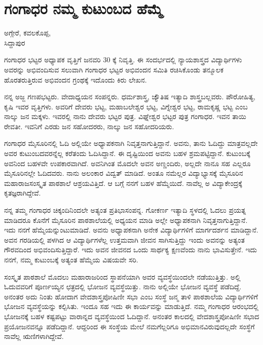 {\fontsize{14}{16}\selectfont
\chapter{ಗಂಗಾಧರ ನಮ್ಮ ಕುಟುಂಬದ ಹೆಮ್ಮೆ}

\begin{center}
\smallskip

ಅಗ್ಗೇರೆ, ಕವಲಕೊಪ್ಪ,\\ 
ಸಿದ್ದಾಪುರ
\addrule
\end{center}
ಗಂಗಾಧರ ಭಟ್ಟರ ಅಧ್ಯಾಪಕ ವೃತ್ತಿಗೆ ಜನವರಿ 30 ಕ್ಕೆ ನಿವೃತ್ತಿ. ಈ ಸಂದರ್ಭದಲ್ಲಿ ನ್ಯಾಯಶಾಸ್ತ್ರದ ವಿದ್ಯಾರ್ಥಿಗಳು ಅವರನ್ನು ಅಭಿವಂದಿಸುವ ಸಲುವಾಗಿ ಗಂಗಾಧರ ಭಟ್ಟರ ಅಭಿವಂದನ ಸಮಿತಿ ರಚಿಸಿಕೊಂಡು ತನ್ಮೂಲಕ ಹೊರತರುತ್ತಿರುವ ಅಭಿವಂದನ ಗ್ರಂಥಕ್ಕೆ ಇದೊಂದು ಕಿರು ಲೇಖನ.

ನನ್ನ ಅಜ್ಜ ಗಣಪಭಟ್ಟರು. ವೇದಾಧ್ಯಯನ ಸಂಪನ್ನರು. ಧರ್ಮಶಾಸ್ತ್ರ, ಜ್ಯೌತಿಷ ಇತ್ಯಾದಿ ಶಾಸ್ತ್ರಬಲ್ಲವರು. ಪೌರೋಹಿತ್ಯ, ಕೃಷಿ ಇವರ ವೃತ್ತಿಗಳು. ಅವರಿಗೆ ದೇವರು ಭಟ್ಟ, ಮಹಾಬಲೇಶ್ವರ ಭಟ್ಟ, ವಿಗ್ನೇಶ್ವರ ಭಟ್ಟ, ರಾಮಕೃಷ್ಣ ಭಟ್ಟ ಎಂಬ ನಾಲ್ಕು ಜನ ಮಕ್ಕಳು. ಇವರಲ್ಲಿ ನಾನು ದೇವರು ಭಟ್ಟರ ಪುತ್ರ. ವಿಘ್ನೇಶ್ವರ ಭಟ್ಟರ ಪುತ್ರ ಗಂಗಾಧರ. ಇವನ ತಾಯಿ ರೇವತೀ. ಇವನಿಗೆ ಎರಡು ಜನ ಸಹೋದರರು, ನಾಲ್ಕು ಜನ ಸಹೋದರಿಯರು.

ಗಂಗಾಧರ ಮೈಸೂರಿನಲ್ಲಿ ಓದಿ ಅಲ್ಲಿಯೇ ಅಧ್ಯಾಪಕನಾಗಿ ನಿವೃತ್ತನಾಗುತ್ತಿದ್ದಾನೆ. ಅವನು, ತಾನು ಓದಿದ್ದು ಮಾತ್ರವಲ್ಲದೇ ಅವರ ಕುಟುಂಬದವರನ್ನೆಲ್ಲ ಕರೆತಂದು ಓದಿಸಿದ್ದಾನೆ. ಈ ದೃಷ್ಟಿಯಿಂದ ಅವನು ಬಹಳ ಶ್ರಮಪಟ್ಟಿದ್ದಾನೆ. ಕುಟುಂಬಕ್ಕೆ ಅವನಿಂದ ಬಹಳವೇ ಉಪಕಾರವಾಗಿದೆ. ಅವನಿಗಿಂತ ಮೊದಲೇ ಅವನ ಅಣ್ಣಂದಿರು, ಅಲ್ಲದೇ ನಾನೂ ಸಹ ಎಲ್ಲರೂ ಮೈಸೂರಿನಲ್ಲೇ ಓದಿದವರು. ನಾನು ಅಲಂಕಾರ ವಿದ್ವತ್ ಮಾಡಿದೆ. ಅಂತೂ ನಮೆಲ್ಲರ ವಿದ್ಯಾಭ್ಯಾಸಕ್ಕೆ ಮೈಸೂರಿನ ಮಹಾರಾಜಸಂಸ್ಕೃತ ಪಾಠಶಾಲೆ ಆಶ್ರಯವಿತ್ತಿದೆ. ಆ ಬಗ್ಗೆ ನನಗೆ ಬಹಳ ಹೆಮ್ಮೆಯಿದೆ. ನಾವೆಲ್ಲ ಅ ವಿದ್ಯಾಕೇಂದ್ರಕ್ಕೆ ಕೃತಜ್ಞರಾಗಿದ್ದೇವೆ. 

ನನ್ನ ತಮ್ಮ ಗಂಗಾಧರ ಚಿಕ್ಕಂದಿನಿಂದಲೇ ಅತ್ಯಂತ ಪ್ರತಿಭಾಸಂಪನ್ನ. ಗೋಕರ್ಣ ಇತ್ಯಾದಿ ಸ್ಥಳದಲ್ಲಿ ಓದಲು ಪ್ರಯತ್ನ ಮಾಡಿದರೂ ಕೊನೆಗೆ ಮೈಸೂರಿನ ಪಾಠಶಾಲೆಯಲ್ಲಿ ಅಧ್ಯಯನ ಮಾಡಿ ಅಲ್ಲೇ ಅಧ್ಯಾಪಕನಾಗಿ ನಿವೃತ್ತನಾಗುತ್ತಿದ್ದಾನೆ. ಇದು ನನಗೆ ಹೆಮ್ಮೆಯನ್ನುಂಟುಮಾಡಿದೆ. ಅವನು ಅಧ್ಯಾಪಕನಾಗಿ ಅನೇಕ ವಿದ್ಯಾರ್ಥಿಗಳಿಗೆ ಮಾರ್ಗದರ್ಶನ ಮಾಡಿದ್ದಾನೆ. ಅವನ ಗರಡಿಯಲ್ಲಿ ಪಳಗಿದ ಆ ವಿದ್ಯಾರ್ಥಿಗಳೆಲ್ಲ ಉತ್ತಮವಾಗಿ ಜೀವನ ಸಾಗಿಸುತ್ತಿದ್ದು ಇಂದು ಅವನನ್ನು ಅತ್ಯಂತ ಗೌರವದಿಂದ ಅಭಿವಂದಿಸುತ್ತಿದ್ದಾರೆ. ಇದು ಅವನ ಜೀವನದ ಒಂದು ಸಾರ್ಥಕ್ಯ ಕ್ಷಣವೆಂದು ನಾನು ಭಾವಿಸುತ್ತೇನೆ. ಇದು ನನಗೆ, ನಮ್ಮ ಕುಟುಂಬಕ್ಕೆ ಅತ್ಯಂತ ಹೆಮ್ಮೆಯ ವಿಷಯವೇ ಸರಿ.

ಸಂಸ್ಕೃತ ಪಾಠಶಾಲೆ ಮೊದಲು ಮಹಾರಾಜರಿಂದ ಸ್ಥಾಪನೆಯಾಗಿ ಅವರ ವ್ಯವಸ್ಥೆಯಿಂದಲೇ ನಡೆಯುತ್ತಿತ್ತು. ಅಲ್ಲಿ ಓದುವವರಿಗೆ ಪೂರ್ಣಯ್ಯನ ಛತ್ರದಲ್ಲಿ ಭೋಜನ ವ್ಯವಸ್ಥೆಯಿತ್ತು. ನಾನು ಅಲ್ಲಿಯೇ ಭೋಜನ ವ್ಯವಸ್ಥೆ ಪಡೆದಿದ್ದೆ. ಅನಂತರ ಅದು ನಿಂತು ಹೋದಾಗ ವೇದಶಾಸ್ತ್ರಪೋಷಿಣೀ ಸಭಾ ಎಂಬ ಸಂಸ್ಥೆ ಜನ್ಮ ತಾಳಿ ಪಾಠಶಾಲೆಯ ವಿದ್ಯಾರ್ಥಿಗಳಿಗೆ ಭೋಜನ ವ್ಯವಸ್ಥೆಯನ್ನು ಕಲ್ಪಿಸಿತು. ಇಂದೂ ಸಹ ಇದು ಈ ಕಾರ್ಯವನ್ನು ಮಾಡುತ್ತಿದೆ. ನಮ್ಮ ಗಂಗಾಧರ ಆರಂಭದಲ್ಲಿ ಭೋಜನಕ್ಕೆ ಬಹಳ ಕಷ್ಟಪಟ್ಟು ವಾರಾನ್ನದ ವ್ಯವಸ್ಥೆಯಿಂದ ಓದಿದ್ದಾನೆ. ಅನಂತರ ಕಾಲದಲ್ಲಿ ವೇದಶಾಸ್ತ್ರಪೋಷಿಣೀ ಸಭಾದ ಪ್ರಯೋಜನವನ್ನೂ ಪಡೆದಿದ್ದಾನೆ. ಆದ್ದರಿಂದ ಈ ಸಂಸ್ಥೆಯ ಮೇಲೆ ನಮಗೆಲ್ಲರಿಗೂ ಅಭಿಮಾನವಿರುವುದಲ್ಲದೇ ಸಂಸ್ಥೆಗೆ ನಾವೆಲ್ಲ ಋಣಿಗಳಾಗಿದ್ದೇವೆ. 

}
